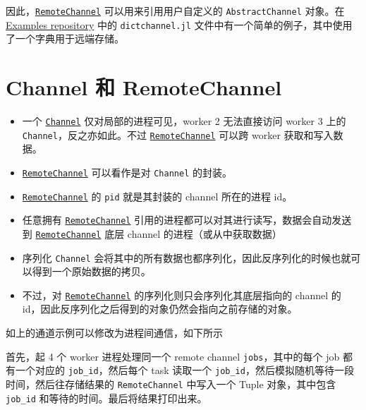 因此，\hyperlink{16773267780467157552}{\texttt{RemoteChannel}} 可以用来引用用户自定义的 \texttt{AbstractChannel} 对象。在 \href{https://github.com/JuliaAttic/Examples}{Examples repository} 中的 \texttt{dictchannel.jl} 文件中有一个简单的例子，其中使用了一个字典用于远端存储。



\hypertarget{1217793571907460984}{}


\section{Channel 和 RemoteChannel}



\begin{itemize}
\item 一个 \hyperlink{12548845729684045604}{\texttt{Channel}} 仅对局部的进程可见，worker 2 无法直接访问 worker 3 上的 \texttt{Channel}，反之亦如此。不过 \hyperlink{16773267780467157552}{\texttt{RemoteChannel}} 可以跨 worker 获取和写入数据。


\item \hyperlink{16773267780467157552}{\texttt{RemoteChannel}} 可以看作是对 \texttt{Channel} 的封装。


\item \hyperlink{16773267780467157552}{\texttt{RemoteChannel}} 的 \texttt{pid} 就是其封装的 channel 所在的进程 id。


\item 任意拥有 \hyperlink{16773267780467157552}{\texttt{RemoteChannel}} 引用的进程都可以对其进行读写，数据会自动发送到 \hyperlink{16773267780467157552}{\texttt{RemoteChannel}} 底层 channel 的进程（或从中获取数据）


\item 序列化 \texttt{Channel} 会将其中的所有数据也都序列化，因此反序列化的时候也就可以得到一个原始数据的拷贝。


\item 不过，对 \hyperlink{16773267780467157552}{\texttt{RemoteChannel}} 的序列化则只会序列化其底层指向的 channel 的 id，因此反序列化之后得到的对象仍然会指向之前存储的对象。

\end{itemize}


如上的通道示例可以修改为进程间通信，如下所示



首先，起 4 个 worker 进程处理同一个 remote channel \texttt{jobs}，其中的每个 job 都有一个对应的 \texttt{job\_id}，然后每个 task 读取一个 \texttt{job\_id}，然后模拟随机等待一段时间，然后往存储结果的 \texttt{RemoteChannel} 中写入一个 Tuple 对象，其中包含 \texttt{job\_id} 和等待的时间。最后将结果打印出来。




